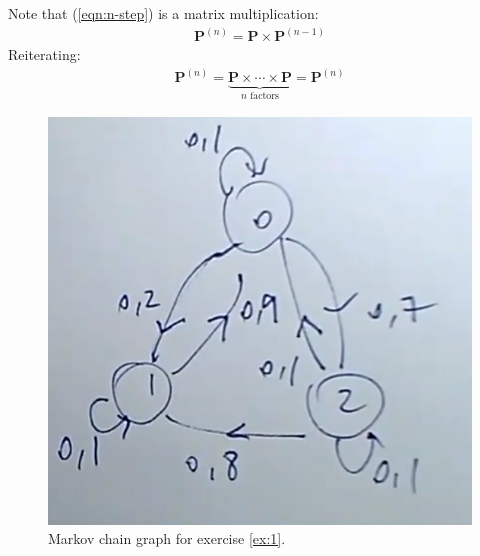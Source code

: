 \documentclass[../template.tex]{subfiles}
\begin{document}
\medskip

Note that (\ref{eqn:n-step}) is a matrix multiplication:
\begin{align*}
    \textbf{P}^{(n)} = \textbf{P} \times \textbf{P}^{(n-1)}
\end{align*}
Reiterating:
\begin{align*}
    \textbf{P}^{(n)} = \underbrace{\textbf{P} \times \cdots \times \textbf{P} }_{\text{$n$ factors}} = \textbf{P}^{(n)} 
\end{align*}

\begin{figure}[htp]
    \centering
    \includegraphics{image003.png}
    \caption{Markov chain graph for exercise \ref{ex:1}.}
\end{figure}
\end{document}
